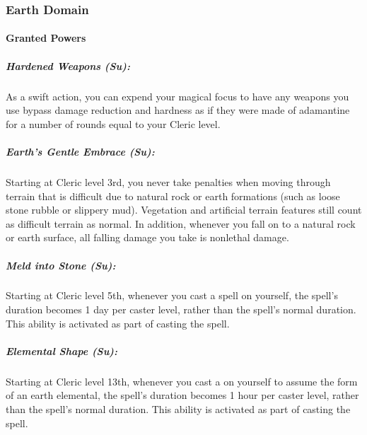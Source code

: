 \subsubsection{Earth Domain}
\paragraph{Granted Powers}
\subparagraph{Hardened Weapons (Su):}
As a swift action, you can expend your magical focus to have any weapons you use bypass damage reduction and hardness as if they were made of adamantine for a number of rounds equal to your Cleric level.
\subparagraph{Earth's Gentle Embrace (Su):}
Starting at Cleric level 3rd, you never take penalties when moving through terrain that is difficult due to natural rock or earth formations (such as loose stone rubble or slippery mud). Vegetation and artificial terrain features still count as difficult terrain as normal.
In addition, whenever you fall on to a natural rock or earth surface, all falling damage you take is nonlethal damage.
\subparagraph{Meld into Stone (Su):}
Starting at Cleric level 5th, whenever you cast a  spell on yourself, the spell's duration becomes 1 day per caster level, rather than the spell's normal duration.
This ability is activated as part of casting the spell.
\subparagraph{Elemental Shape (Su):}
Starting at Cleric level 13th, whenever you cast a  on yourself to assume the form of an earth elemental, 
the spell's duration becomes 1 hour per caster level, rather than the spell's normal duration.
This ability is activated as part of casting the spell.
